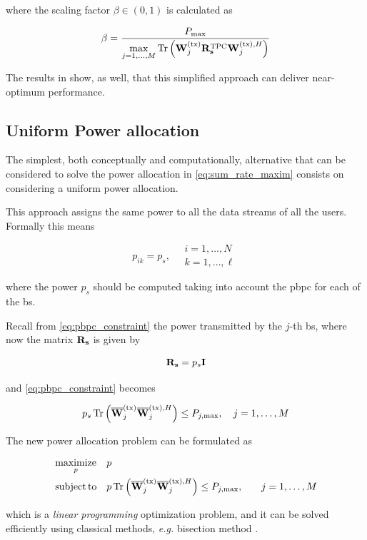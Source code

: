 \noindent
where the scaling factor $\beta \in \left(0, 1\right)$ is calculated as

\begin{equation} \label{eq:scaling_factor}
    \beta = \frac{P_{\max}}{\max\limits_{j=1, \ldots, M} \operatorname*{Tr}\left(
    \mathbf{W}^{(\text{tx})}_j \mathbf{R}_{\mathbf{s}}^{\text{TPC}} \mathbf{W}^{(\text{tx}),H}_j \right)}
\end{equation}

The results in \cite{zhang09} show, as well, that this simplified approach can
deliver near-optimum performance.

\subsection{Uniform Power allocation}\label{ssec:uniform_allocation}

The simplest, both conceptually and computationally, alternative that can be
considered to solve the power allocation in \eqref{eq:sum_rate_maxim} consists
on considering a uniform power allocation.

This approach assigns the same power to all the data streams of all the
users. Formally this means

\begin{equation} \label{eq:equal_power}
    p_{ik} = p_{s}, \quad \begin{array}{l}
        i = 1, \ldots, N \\
        k = 1, \ldots, \ell
    \end{array}
\end{equation}

\noindent
where the power $p_s$ should be computed taking into account the \gls{pbpc} for
each of the \gls{bs}.

Recall from \eqref{eq:pbpc_constraint} the power transmitted by the $j$-th
\gls{bs}, where now the matrix $\mathbf{R}_{\mathbf{s}}$ is given by

\begin{equation} \label{eq:rs_equal}
    \mathbf{R}_{\mathbf{s}} = p_s \mathbf{I}
\end{equation}

\noindent
and \eqref{eq:pbpc_constraint} becomes

\begin{equation} \label{eq:pbpc_equal}
    p_s \operatorname*{Tr} \left( \mathbf{\overline{W}}^{(\text{tx})}_j \mathbf{\overline{W}}^{(\text{tx}),H}_j \right) \leq P_{j, \max}, \quad
    j = 1, \ldots, M
\end{equation}

The new power allocation problem can be formulated as

\begin{equation} \label{eq:equal_optim}
\begin{aligned}
    &\operatorname*{maximize}\limits_{p} && p \\
    &\operatorname*{subject\,to} && p \operatorname*{Tr} \left(\mathbf{\overline{W}}^{(\text{tx})}_j \mathbf{\overline{W}}^{(\text{tx}),H}_j \right) \leq P_{j, \max}, &\quad
    j = 1, \ldots, M
\end{aligned}
\end{equation}

\noindent
which is a \emph{linear programming} optimization problem, and it can be solved
efficiently using classical methods, \emph{e.g.} bisection method
\cite{burden_numerical}.
